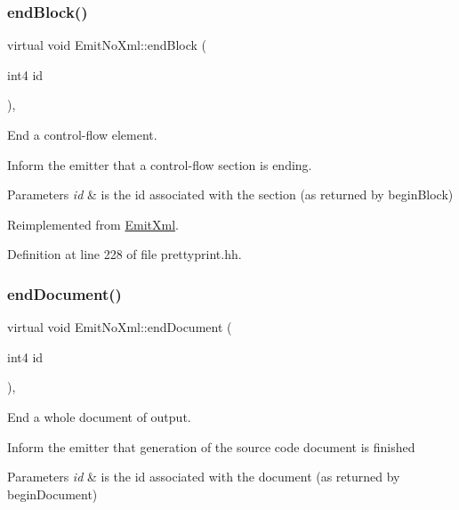\subsubsection{\texorpdfstring{endBlock()}{endBlock()}}
{\footnotesize\ttfamily virtual void Emit\+No\+Xml\+::end\+Block (\begin{DoxyParamCaption}\item[{int4}]{id }\end{DoxyParamCaption})\hspace{0.3cm}{\ttfamily [inline]}, {\ttfamily [virtual]}}



End a control-\/flow element. 

Inform the emitter that a control-\/flow section is ending. 
\begin{DoxyParams}{Parameters}
{\em id} & is the id associated with the section (as returned by begin\+Block) \\
\hline
\end{DoxyParams}


Reimplemented from \mbox{\hyperlink{class_emit_xml_a935b2c6ff63356ee30fa050c2b301bde}{Emit\+Xml}}.



Definition at line 228 of file prettyprint.\+hh.

\mbox{\label{class_emit_no_xml_a453ae349735a6e890eb8ccf3bce4a965}} 
\subsubsection{\texorpdfstring{endDocument()}{endDocument()}}
{\footnotesize\ttfamily virtual void Emit\+No\+Xml\+::end\+Document (\begin{DoxyParamCaption}\item[{int4}]{id }\end{DoxyParamCaption})\hspace{0.3cm}{\ttfamily [inline]}, {\ttfamily [virtual]}}



End a whole document of output. 

Inform the emitter that generation of the source code document is finished 
\begin{DoxyParams}{Parameters}
{\em id} & is the id associated with the document (as returned by begin\+Document) \\
\hline
\end{DoxyParams}


